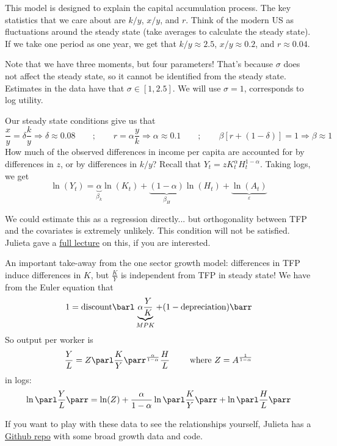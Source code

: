 \documentclass[10pt]{article}
\begin{document}
\begin{example}
	This model is designed to explain the capital accumulation process. The key statistics that we care about are $k/y$, $x/y$, and $r$. Think of the modern US as fluctuations around the steady state (\ie take averages to calculate the steady state). If we take one period as one year, we get that $k/y \approx 2.5$, $x/y \approx 0.2$, and $r \approx 0.04$. 
	\begin{remark}
		Note that we have three moments, but four parameters! That's because $\sigma$ does not affect the steady state, so it cannot be identified from the steady state. Estimates in the data have that $\sigma \in [1,2.5]$. We will use $\sigma = 1$, corresponds to log utility.
	\end{remark}
	Our steady state conditions give us that
	\[
	\frac{x}{y} = \delta \frac{k}{y} \Longrightarrow\delta \approx 0.08 \qquad ; \qquad r = \alpha \frac{y}{k} \Longrightarrow \alpha \approx 0.1 \qquad ; \qquad \beta[r + (1-\delta)] = 1 \Longrightarrow \beta \approx 1
	\]
	How much of the observed differences in income per capita are accounted for by differences in $z$, or by differences in $k/y$? Recall that $Y_t = z K_t^\alpha H_t^{1-\alpha}$. Taking logs, we get
	\[
	\ln(Y_t) = \underbrace{\alpha}_{\beta_k} \ln(K_t) +\underbrace{(1-\alpha)}_{\beta_H} \ln(H_t) + \underbrace{\ln(A_t)}_{\varepsilon}
	\]
	\begin{remark}
		We could estimate this as a regression directly... but orthogonality between TFP and the covariates is extremely unlikely. This condition will not be satisfied. Julieta gave a \href{https://www.youtube.com/watch?v=lG-DvqsxVfg}{full lecture} on this, if you are interested.
	\end{remark}
\end{example}

An important take-away from the one sector growth model: differences in TFP induce differences in $K$, but $\frac{K}{Y}$ is independent from TFP in steady state! We have from the Euler equation that \[1 = \text{discount} \barl \underbrace{\alpha \frac{Y}{K}}_{MPK} + (1 - \text{depreciation})\barr \]So output per worker is \[\frac{Y}{L} = Z \parl \frac{K}{Y}\parr^\frac{\alpha}{1-\alpha} \frac{H}{L}\qquad \text{ where } Z = A^\frac{1}{1-\alpha}\]in logs: \[ \ln \parl \frac{Y}{L}\parr = \ln(Z) + \frac{\alpha}{1-\alpha} \ln\parl \frac{K}{Y}\parr + \ln \parl \frac{H}{L}\parr \]

If you want to play with these data to see the relationships yourself, Julieta has a \href{https://github.com/julicaunedo/STEG_Lecture2}{Github repo} with some broad growth data and code.
\end{document}
